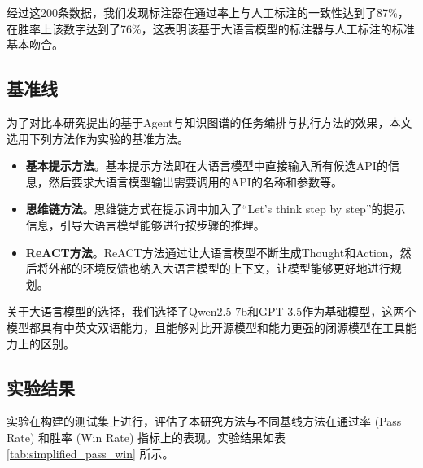 经过这200条数据，我们发现标注器在通过率上与人工标注的一致性达到了87\%，在胜率上该数字达到了76\%，这表明该基于大语言模型的标注器与人工标注的标准基本吻合。

\subsection{基准线}

为了对比本研究提出的基于Agent与知识图谱的任务编排与执行方法的效果，本文选用下列方法作为实验的基准方法。

\begin{itemize}
  \item  \textbf{基本提示方法}。基本提示方法即在大语言模型中直接输入所有候选API的信息，然后要求大语言模型输出需要调用的API的名称和参数等。
  \item  \textbf{思维链方法}\cite{Wang2023a}。思维链方式在提示词中加入了“Let's think step by step”的提示信息，引导大语言模型能够进行按步骤的推理。
  \item  \textbf{ReACT方法}\cite{Yao2023b}。ReACT方法通过让大语言模型不断生成Thought和Action，然后将外部的环境反馈也纳入大语言模型的上下文，让模型能够更好地进行规划。
\end{itemize}
\indent

关于大语言模型的选择，我们选择了Qwen2.5-7b和GPT-3.5作为基础模型，这两个模型都具有中英文双语能力，且能够对比开源模型和能力更强的闭源模型在工具能力上的区别。

\subsection{实验结果}
实验在构建的测试集上进行，评估了本研究方法与不同基线方法在通过率 (Pass Rate) 和胜率 (Win Rate) 指标上的表现。实验结果如表 \ref{tab:simplified_pass_win} 所示。

